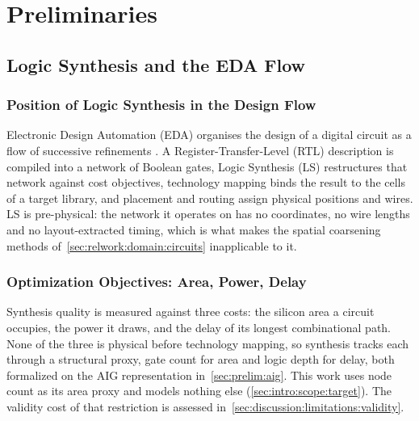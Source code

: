 \section{Preliminaries}
\label{sec:prelim}

\subsection{Logic Synthesis and the EDA Flow}
\label{sec:prelim:synthesis}


\subsubsection{Position of Logic Synthesis in the Design Flow}
\label{sec:prelim:synthesis:flow}
Electronic Design Automation (EDA) organises the design of a digital circuit as a flow of
successive refinements \citep{demicheli1994synthesis}. A Register-Transfer-Level (RTL)
description is compiled into a network of Boolean gates, Logic Synthesis (LS) restructures
that network against cost objectives, technology mapping binds the result to the cells of
a target library, and placement and routing assign physical positions and wires. LS is
pre-physical: the network it operates on has no coordinates, no wire lengths and no
layout-extracted timing, which is what makes the spatial coarsening methods
of~\ref{sec:relwork:domain:circuits} inapplicable to it.


\subsubsection{Optimization Objectives: Area, Power, Delay}
\label{sec:prelim:synthesis:objectives}
Synthesis quality is measured against three costs: the silicon area a circuit occupies,
the power it draws, and the delay of its longest combinational path. None of the three is
physical before technology mapping, so synthesis tracks each through a structural proxy,
gate count for area and logic depth for delay, both formalized on the AIG representation
in~\ref{sec:prelim:aig}. This work uses node count as its area proxy and models nothing
else (\ref{sec:intro:scope:target}). The validity cost of that restriction is assessed
in~\ref{sec:discussion:limitations:validity}. 

